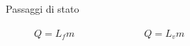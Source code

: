 \documentclass[a4paper,11pt,italian]{article}
\begin{document}
\begin{description}
  
  \item[Passaggi di stato] 
  $ Q = L_f m $~~~~~~~~~~~~~~$ Q = L_v m $
\end{description}

%
%   
\end{document}
